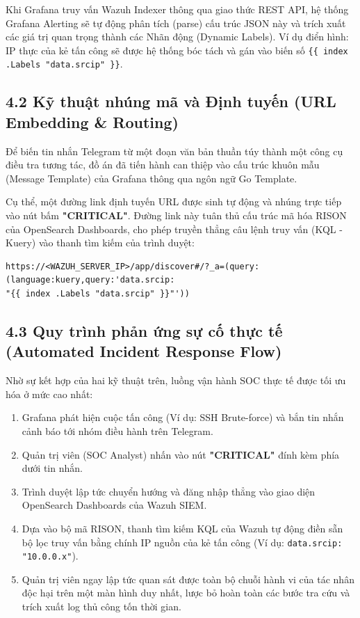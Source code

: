 \documentclass[13pt,a4paper]{extarticle}
\begin{document}
Khi Grafana truy vấn Wazuh Indexer thông qua giao thức REST API, hệ thống Grafana Alerting sẽ tự động phân tích (parse) cấu trúc JSON này và trích xuất các giá trị quan trọng thành các Nhãn động (Dynamic Labels). Ví dụ điển hình: IP thực của kẻ tấn công sẽ được hệ thống bóc tách và gán vào biến số \verb|{{ index .Labels "data.srcip" }}|.

\subsection{4.2 Kỹ thuật nhúng mã và Định tuyến (URL Embedding \& Routing)}
Để biến tin nhắn Telegram từ một đoạn văn bản thuần túy thành một công cụ điều tra tương tác, đồ án đã tiến hành can thiệp vào cấu trúc khuôn mẫu (Message Template) của Grafana thông qua ngôn ngữ Go Template. 

Cụ thể, một đường link định tuyến URL được sinh tự động và nhúng trực tiếp vào nút bấm \textbf{"CRITICAL"}. Đường link này tuân thủ cấu trúc mã hóa RISON của OpenSearch Dashboards, cho phép truyền thẳng câu lệnh truy vấn (KQL - Kuery) vào thanh tìm kiếm của trình duyệt:

\begin{verbatim}
https://<WAZUH_SERVER_IP>/app/discover#/?_a=(query:(language:kuery,query:'data.srcip:
"{{ index .Labels "data.srcip" }}"'))
\end{verbatim}

\subsection{4.3 Quy trình phản ứng sự cố thực tế (Automated Incident Response Flow)}
Nhờ sự kết hợp của hai kỹ thuật trên, luồng vận hành SOC thực tế được tối ưu hóa ở mức cao nhất:
\begin{enumerate}
    \item Grafana phát hiện cuộc tấn công (Ví dụ: SSH Brute-force) và bắn tin nhắn cảnh báo tới nhóm điều hành trên Telegram.
    \item Quản trị viên (SOC Analyst) nhấn vào nút \textbf{"CRITICAL"} đính kèm phía dưới tin nhắn.
    \item Trình duyệt lập tức chuyển hướng và đăng nhập thẳng vào giao diện OpenSearch Dashboards của Wazuh SIEM.
    \item Dựa vào bộ mã RISON, thanh tìm kiếm KQL của Wazuh tự động điền sẵn bộ lọc truy vấn bằng chính IP nguồn của kẻ tấn công (Ví dụ: \texttt{data.srcip: "10.0.0.x"}).
    \item Quản trị viên ngay lập tức quan sát được toàn bộ chuỗi hành vi của tác nhân độc hại trên một màn hình duy nhất, lược bỏ hoàn toàn các bước tra cứu và trích xuất log thủ công tốn thời gian.
\end{enumerate}
\end{document}

